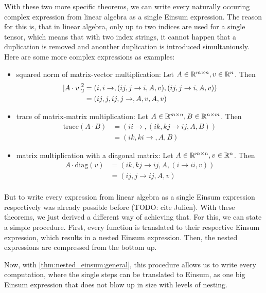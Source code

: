 

With these two more specific theorems, we can write every naturally occuring complex expression from linear algebra as a single Einsum expression.
The reason for this is, that in linear algebra, only up to two indices are used for a single tensor,
which means that with two index strings, it cannot happen that a duplication is removed and anonther duplication is introduced simultaniously.
Here are some more complex expressions as examples:
\begin{itemize}
    \item squared norm of matrix-vector multiplication: Let $A \in \mathbb{R}^{m \times n}, v \in \mathbb{R}^{n}$. Then
          \begin{align*}
              \left\lvert A \cdot v \right\rvert_2^2 & = (i,i\rightarrow,(ij, j \rightarrow i, A, v),(ij, j \rightarrow i, A, v)) \\
                                  & = (ij,j,ij,j\rightarrow,A,v,A,v)
          \end{align*}
    \item trace of matrix-matrix multiplication: Let $A \in \mathbb{R}^{m \times n}, B \in \mathbb{R}^{n \times m}$. Then
          \begin{align*}
              \text{trace}(A \cdot B) & = (ii \rightarrow, (ik, kj \rightarrow ij, A, B)) \\
                                      & = (ik, ki \rightarrow, A, B)
          \end{align*}
    \item matrix multiplication with a diagonal matrix: Let $A \in \mathbb{R}^{m \times n}, v \in \mathbb{R}^{n}$. Then
          \begin{align*}
              A \cdot \text{diag}(v) & = (ik, kj \rightarrow ij, A, (i \rightarrow ii, v)) \\
                                     & = (ij, j \rightarrow ij, A, v)                      \\
          \end{align*}
\end{itemize}

But to write every expression from linear algebra as a single Einsum expression respectively was already possible before (TODO: cite Julien).
With these theorems, we just derived a different way of achieving that.
For this, we can state a simple procedure.
First, every function is translated to their respective Einsum expression, which results in a nested Einsum expression.
Then, the nested expressions are compressed from the bottom up.

Now, with \cref{thm:nested_einsum:general}, this procedure allows us to write every computation, where the single steps can be translated to Einsum, as one big Einsum expression that does not blow up in size with levels of nesting.